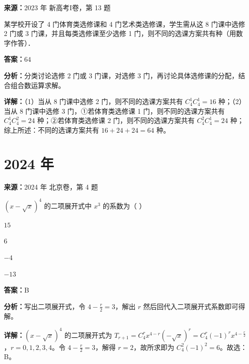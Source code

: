 \begin{question}[points=5]
\textbf{来源：}2023 年 新高考I卷，第 13 题\par
某学校开设了 4 门体育类选修课和 4 门艺术类选修课，学生需从这 8 门课中选修 2 门或 3 门课，并且每类选修课至少选修 1 门，则不同的选课方案共有种（用数字作答）．
\fillin[{$64$}]
\begin{solution}
\textbf{答案：}$64$

\textbf{分析：}分类讨论选修 2 门或 3 门课，对选修 3 门，再讨论具体选修课的分配，结合组合数运算求解。

\textbf{详解：}（1）当从 8 门课中选修 2 门，则不同的选课方案共有 $C_4^1C_4^1=16$ 种；（2）当从 8 门课中选修 3 门，①若体育类选修课 1 门，则不同的选课方案共有 $C_4^1C_4^2=24$ 种；②若体育类选修课 2 门，则不同的选课方案共有 $C_4^2C_4^1=24$ 种；综上所述：不同的选课方案共有 $16+24+24=64$ 种。
\end{solution}
\end{question}

\section*{2024 年}

\begin{question}[points=4]
\textbf{来源：}2024 年 北京卷，第 4 题\par
$(x - \sqrt{x})^4$ 的二项展开式中 $x^3$ 的系数为（ ）
\begin{choices}
  \item $15$
  \item $6$
  \item $-4$
  \item $-13$
\end{choices}
\begin{solution}
\textbf{答案：}B

\textbf{分析：}写出二项展开式，令 $4-\frac{r}{2}=3$，解出 $r$ 然后回代入二项展开式系数即可得解。

\textbf{详解：}$(x - \sqrt{x})^4$ 的二项展开式为 $T_{r+1} = C_4^r x^{4-r} (-\sqrt{x})^r = C_4^r (-1)^r x^{4-\frac{r}{2}}$，$r=0,1,2,3,4$。令 $4-\frac{r}{2}=3$，解得 $r=2$，故所求即为 $C_4^2 (-1)^2 = 6$。故选：B。
\end{solution}
\end{question}

